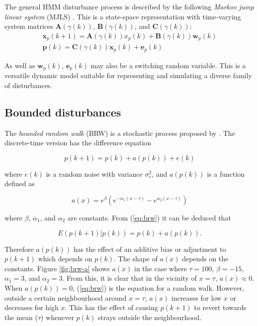 The general HMM disturbance process is described by the following \textit{Markov jump linear system} (MJLS) \citep{costa_discrete-time_2005}. This is a state-space representation with time-varying system matrices $\mathbf{A}(\gamma(k))$, $\mathbf{B}(\gamma(k))$, and $\mathbf{C}(\gamma(k))$:
\begin{equation} \label{eq:HMM}
	\begin{split}
	\mathbf{x}_p(k+1) = \mathbf{A}(\gamma(k))x_p(k) + \mathbf{B}(\gamma(k))\mathbf{w}_p(k) \\
	\mathbf{p}(k) = \mathbf{C}(\gamma(k)) \mathbf{x}_p(k) + \mathbf{e}_p(k)
	\end{split}
\end{equation}

As well as $\mathbf{w}_p(k)$, $\mathbf{e}_p(k)$ may also be a switching random variable. This is a versatile dynamic model suitable for representing and simulating a diverse family of disturbances.

\subsection{Bounded disturbances}

The \textit{bounded random walk} (BRW) is a stochastic process proposed by \citep{nicolau_stationary_2002}. The discrete-time version has the difference equation

\begin{equation} \label{eq:brw}
		p(k+1) = p(k) + a(p(k)) + e(k)
\end{equation}

where $e(k)$ is a random noise with variance $\sigma_e^2$, and $a(p(k))$ is a function defined as

\begin{equation}
	a(x) = e^{\beta}\left(e^{-\alpha_{1}\left(x - \tau\right)} - e^{\alpha_{2}\left(x - \tau\right)}\right)
\end{equation}

where $\beta$, $\alpha_{1}$, and $\alpha_{2}$ are constants.  From (\ref{eq:brw}) it can be deduced that

\begin{equation}
	E(p(k+1)|p(k)) = p(k) + a(p(k)).
\end{equation}

Therefore $a(p(k))$ has the effect of an additive bias or adjustment to $p(k+1)$ which depends on $p(k)$. The shape of $a(x)$ depends on the constants. Figure \ref{fig:brw-a} shows $a(x)$ in the case where $\tau=100$, $\beta=-15$, $\alpha_{1}=3$, and $\alpha_{2}=3$.  From this, it is clear that in the vicinity of $x=\tau$, $a(x)\approx0$. When $a(p(k))=0$, (\ref{eq:brw}) is the equation for a random walk. However, outside a certain neighbourhood around $x=\tau$, $a(x)$ increases for low $x$ or decreases for high $x$. This has the effect of causing $p(k+1)$ to revert towards the mean ($\tau$) whenever $p(k)$ strays outside the neighbourhood. 

